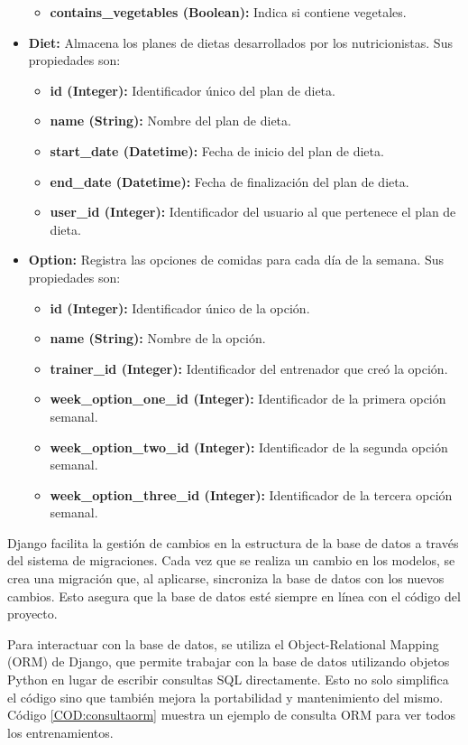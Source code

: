 \begin{itemize}
\begin{itemize}
        \item \textbf{contains\_vegetables (Boolean):} Indica si contiene vegetales.
    \end{itemize}
    \item \textbf{Diet:} Almacena los planes de dietas desarrollados por los nutricionistas. Sus propiedades son:
    \begin{itemize}
        \item \textbf{id (Integer):} Identificador único del plan de dieta.
        \item \textbf{name (String):} Nombre del plan de dieta.
        \item \textbf{start\_date (Datetime):} Fecha de inicio del plan de dieta.
        \item \textbf{end\_date (Datetime):} Fecha de finalización del plan de dieta.
        \item \textbf{user\_id (Integer):} Identificador del usuario al que pertenece el plan de dieta.
    \end{itemize}
    \item \textbf{Option:} Registra las opciones de comidas para cada día de la semana. Sus propiedades son:
    \begin{itemize}
        \item \textbf{id (Integer):} Identificador único de la opción.
        \item \textbf{name (String):} Nombre de la opción.
        \item \textbf{trainer\_id (Integer):} Identificador del entrenador que creó la opción.
        \item \textbf{week\_option\_one\_id (Integer):} Identificador de la primera opción semanal.
        \item \textbf{week\_option\_two\_id (Integer):} Identificador de la segunda opción semanal.
        \item \textbf{week\_option\_three\_id (Integer):} Identificador de la tercera opción semanal.
    \end{itemize}
\end{itemize}

Django facilita la gestión de cambios en la estructura de la base de datos a través del sistema de migraciones. Cada vez que se realiza un cambio en los modelos, se crea una migración que, al aplicarse, sincroniza la base de datos con los nuevos cambios. Esto asegura que la base de datos esté siempre en línea con el código del proyecto.

Para interactuar con la base de datos, se utiliza el Object-Relational Mapping (ORM) de Django, que permite trabajar con la base de datos utilizando objetos Python en lugar de escribir consultas SQL directamente. Esto no solo simplifica el código sino que también mejora la portabilidad y mantenimiento del mismo. Código \ref{COD:consultaorm} muestra un ejemplo de consulta ORM para ver todos los entrenamientos.

